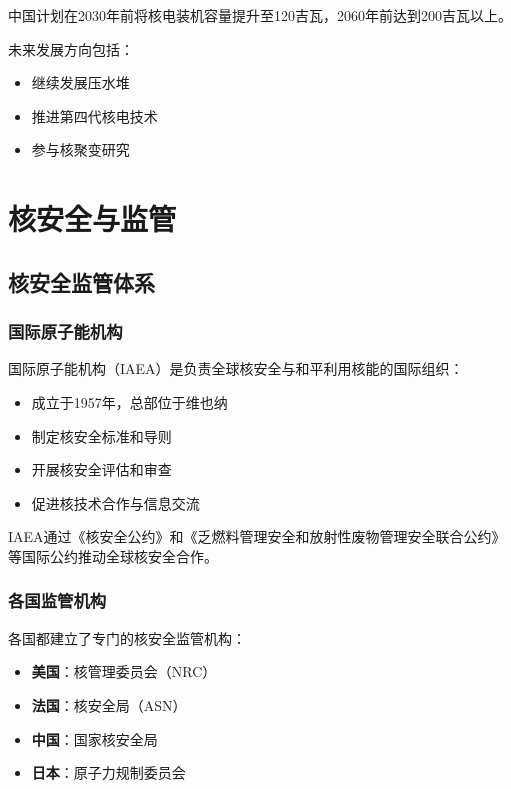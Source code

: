 \documentclass[12pt,UTF8]{ctexbook}
\begin{document}
中国计划在2030年前将核电装机容量提升至120吉瓦，2060年前达到200吉瓦以上。

未来发展方向包括：
\begin{itemize}[leftmargin=2cm]
    \item 继续发展压水堆
    \item 推进第四代核电技术
    \item 参与核聚变研究
\end{itemize}

\part{核安全与监管}

\chapter{核安全监管体系}

\section{国际原子能机构}

国际原子能机构（IAEA）是负责全球核安全与和平利用核能的国际组织：

\begin{itemize}[leftmargin=2cm]
    \item 成立于1957年，总部位于维也纳
    \item 制定核安全标准和导则
    \item 开展核安全评估和审查
    \item 促进核技术合作与信息交流
\end{itemize}

IAEA通过《核安全公约》和《乏燃料管理安全和放射性废物管理安全联合公约》等国际公约推动全球核安全合作。

\section{各国监管机构}

各国都建立了专门的核安全监管机构：

\begin{itemize}[leftmargin=2cm]
    \item \textbf{美国}：核管理委员会（NRC）
    \item \textbf{法国}：核安全局（ASN）
    \item \textbf{中国}：国家核安全局
    \item \textbf{日本}：原子力规制委员会
\end{itemize}
\end{document}
